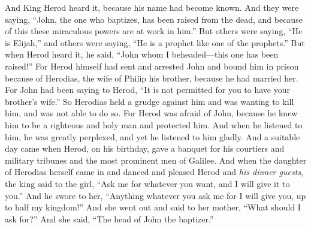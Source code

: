 \begin{biblechapter}
 And King Herod heard it, because his name had become known. And they were saying, “John, the one who baptizes, has been raised from the dead, and because of this these miraculous powers are at work in him.”
\verse But others were saying, “He is Elijah,” and others were saying, “He is a prophet like one of the prophets.”
\verse But when Herod heard it, he said, “John whom I beheaded—this one has been raised!”
\verse For Herod himself had sent and arrested John and bound him in prison because of Herodias, the wife of Philip his brother, because he had married her.
\verse For John had been saying to Herod, “It is not permitted for you to have your brother’s wife.”
\verse So Herodias held a grudge against him and was wanting to kill him, and was not able to do so.
\verse For Herod was afraid of John, because he knew him to be a righteous and holy man and protected him. And when he listened to him, he was greatly perplexed, and yet he listened to him gladly.
\verse And a suitable day came when Herod, on his birthday, gave a banquet for his courtiers and military tribunes and the most prominent men of Galilee.
\verse And when the daughter of Herodias herself came in and danced and pleased Herod and \textit{his dinner guests}, the king said to the girl, “Ask me for whatever you want, and I will give it to you.”
\verse And he swore to her, “Anything whatever you ask me for I will give you, up to half my kingdom!”
\verse And she went out and said to her mother, “What should I ask for?” And she said, “The head of John the baptizer.”

\end{biblechapter}
